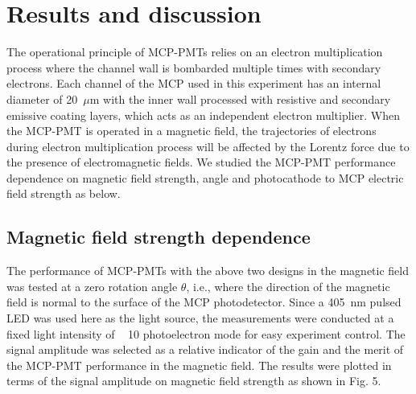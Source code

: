\documentclass[preprint,5p]{elsarticle}
\begin{document}
\section{Results and discussion} \label{}
The operational principle of MCP-PMTs relies on an electron multiplication process 
where the channel wall is bombarded multiple times with secondary electrons. Each 
channel of the MCP used in this experiment has an internal diameter of 
20~$\mu$m with the inner wall processed with resistive and secondary emissive 
coating layers, which acts as an independent electron multiplier. When the MCP-PMT is 
operated in a magnetic field, the trajectories of electrons during electron 
multiplication process will be affected by the Lorentz force due to the 
presence of electromagnetic fields. We studied the MCP-PMT performance 
dependence on magnetic field strength, angle and photocathode to MCP electric 
field strength as below. 

\subsection{Magnetic field strength dependence} \label{}
The performance of MCP-PMTs with the above two designs in the magnetic field 
was tested at a zero rotation angle $\theta$, i.e., where the direction of the 
magnetic field is normal to the surface of the MCP photodetector. Since a 
405~nm pulsed LED was used here as the light source, the measurements were 
conducted at a fixed light intensity of ~ 10 photoelectron mode for easy 
experiment control.  The signal amplitude was selected as a relative indicator 
of the gain and the merit of the MCP-PMT performance in the magnetic field.  
The results were plotted in terms of the signal amplitude on magnetic field 
strength as shown in Fig. 5. 
\end{document}
